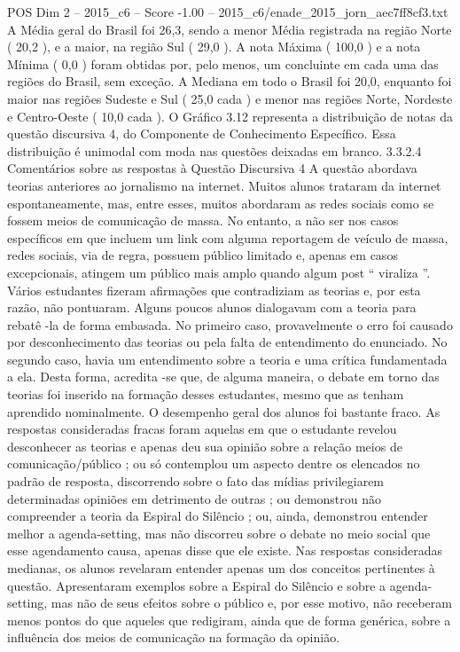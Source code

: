 \begin{textsample}{POS Dim 2 – 2015\_c6 – Score -1.00 – 2015\_c6/enade\_2015\_jorn\_aec7ff8cf3.txt}
A Média geral do Brasil foi 26,3, sendo a menor Média registrada na região Norte ( 20,2 ), e a maior, na região Sul ( 29,0 ).
A nota Máxima ( 100,0 ) e a nota Mínima ( 0,0 ) foram obtidas por, pelo menos, um concluinte em cada uma das regiões do Brasil, sem exceção.
A Mediana em todo o Brasil foi 20,0, enquanto foi maior nas regiões Sudeste e Sul ( 25,0 cada ) e menor nas regiões Norte, Nordeste e Centro-Oeste ( 10,0 cada ).
O Gráfico 3.12 representa a distribuição de notas da questão discursiva 4, do Componente de Conhecimento Específico.
Essa distribuição é unimodal com moda nas questões deixadas em branco. 3.3.2.4 Comentários sobre as respostas à Questão Discursiva 4 A questão abordava teorias anteriores ao jornalismo na internet.
Muitos alunos trataram da internet espontaneamente, mas, entre esses, muitos abordaram as redes sociais como se fossem meios de comunicação de massa.
No entanto, a não ser nos casos específicos em que incluem um link com alguma reportagem de veículo de massa, redes sociais, via de regra, possuem público limitado e, apenas em casos excepcionais, atingem um público mais amplo quando algum post “ viraliza ”.
Vários estudantes fizeram afirmações que contradiziam as teorias e, por esta razão, não pontuaram.
Alguns poucos alunos dialogavam com a teoria para rebatê -la de forma embasada.
No primeiro caso, provavelmente o erro foi causado por desconhecimento das teorias ou pela falta de entendimento do enunciado.
No segundo caso, havia um entendimento sobre a teoria e uma crítica fundamentada a ela.
Desta forma, acredita -se que, de alguma maneira, o debate em torno das teorias foi inserido na formação desses estudantes, mesmo que as tenham aprendido nominalmente.
O desempenho geral dos alunos foi bastante fraco.
As respostas consideradas fracas foram aquelas em que o estudante revelou desconhecer as teorias e apenas deu sua opinião sobre a relação meios de comunicação/público ; ou só contemplou um aspecto dentre os elencados no padrão de resposta, discorrendo sobre o fato das mídias privilegiarem determinadas opiniões em detrimento de outras ; ou demonstrou não compreender a teoria da Espiral do Silêncio ; ou, ainda, demonstrou entender melhor a agenda-setting, mas não discorreu sobre o debate no meio social que esse agendamento causa, apenas disse que ele existe.
Nas respostas consideradas medianas, os alunos revelaram entender apenas um dos conceitos pertinentes à questão.
Apresentaram exemplos sobre a Espiral do Silêncio e sobre a agenda-setting, mas não de seus efeitos sobre o público e, por esse motivo, não receberam menos pontos do que aqueles que redigiram, ainda que de forma genérica, sobre a influência dos meios de comunicação na formação da opinião.

\end{textsample}
